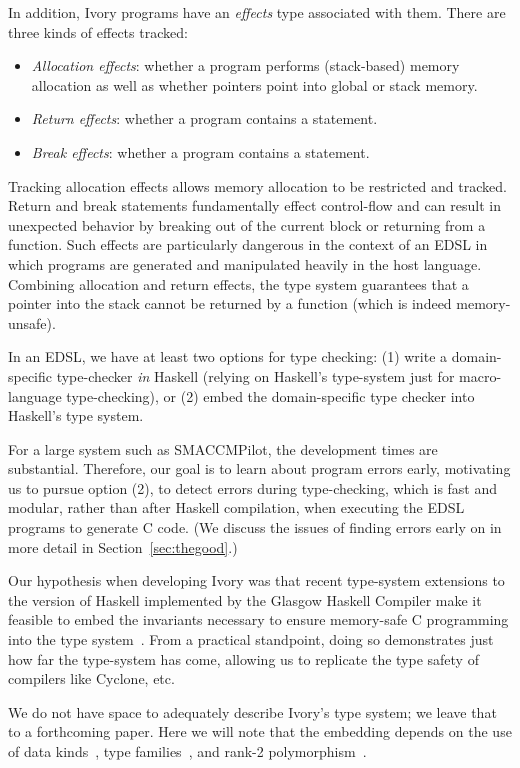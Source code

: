 In addition, Ivory programs have an \emph{effects} type associated with them.
There are three kinds of effects tracked:
\begin{itemize}
  \item \emph{Allocation effects}: whether a program performs (stack-based)
    memory allocation as well as whether pointers point into global or stack memory.
  \item \emph{Return effects}: whether a program contains a  statement.
  \item \emph{Break effects}: whether a program contains a 
    statement.
\end{itemize}
\noindent
Tracking allocation effects allows memory allocation to be restricted and
tracked.  Return and break statements fundamentally effect control-flow and can
result in unexpected behavior by breaking out of the current block or returning
from a function.  Such effects are particularly dangerous in the context of an
EDSL in which programs are generated and manipulated heavily in the host
language.  Combining allocation and return effects, the type system guarantees
that a pointer into the stack cannot be returned by a function (which is indeed
memory-unsafe).

In an EDSL, we have at least two options for type checking: (1) write a
domain-specific type-checker \emph{in} Haskell (relying on Haskell's type-system
just for macro-language type-checking), or (2) embed the domain-specific type
checker into Haskell's type system.

For a large system such as SMACCMPilot, the development times are substantial.
Therefore, our goal is to learn about program errors early, motivating us to
pursue option (2), to detect errors during type-checking, which is fast and
modular, rather than after Haskell compilation, when executing the EDSL programs
to generate C code.  (We discuss the issues of finding errors early on in more
detail in Section~\ref{sec:thegood}.)

Our hypothesis when developing Ivory was that recent type-system extensions to
the version of Haskell implemented by the Glasgow Haskell Compiler make it
feasible to embed the invariants necessary to ensure memory-safe C programming
into the type system~\cite{dephaskell}.  From a practical standpoint, doing so
demonstrates just how far the type-system has come, allowing us to replicate the
type safety of compilers like Cyclone, etc.

We do not have space to adequately describe Ivory's type system; we leave that
to a forthcoming paper.  Here we will note that the embedding depends on the use
of data kinds~\cite{datakinds}, type families~\cite{typefamilies}, and rank-2
polymorphism~\cite{stmonad}.

